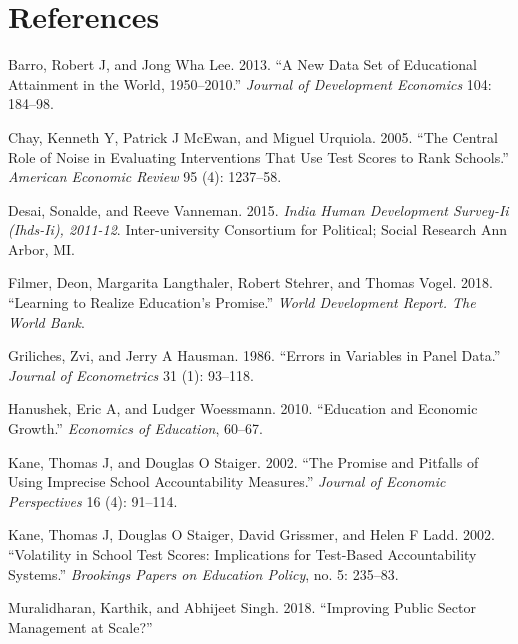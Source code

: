 \documentclass[
  11pt,
]{article}
\begin{document}
\newpage

\hypertarget{references}{%
\section{References}\label{references}}

\hypertarget{refs}{}
\leavevmode\hypertarget{ref-barro2013new}{}%
Barro, Robert J, and Jong Wha Lee. 2013. ``A New Data Set of Educational Attainment in the World, 1950--2010.'' \emph{Journal of Development Economics} 104: 184--98.

\leavevmode\hypertarget{ref-chay2005central}{}%
Chay, Kenneth Y, Patrick J McEwan, and Miguel Urquiola. 2005. ``The Central Role of Noise in Evaluating Interventions That Use Test Scores to Rank Schools.'' \emph{American Economic Review} 95 (4): 1237--58.

\leavevmode\hypertarget{ref-desai2015india}{}%
Desai, Sonalde, and Reeve Vanneman. 2015. \emph{India Human Development Survey-Ii (Ihds-Ii), 2011-12}. Inter-university Consortium for Political; Social Research Ann Arbor, MI.

\leavevmode\hypertarget{ref-filmer2018learning}{}%
Filmer, Deon, Margarita Langthaler, Robert Stehrer, and Thomas Vogel. 2018. ``Learning to Realize Education's Promise.'' \emph{World Development Report. The World Bank}.

\leavevmode\hypertarget{ref-griliches1986errors}{}%
Griliches, Zvi, and Jerry A Hausman. 1986. ``Errors in Variables in Panel Data.'' \emph{Journal of Econometrics} 31 (1): 93--118.

\leavevmode\hypertarget{ref-hanushek2010education}{}%
Hanushek, Eric A, and Ludger Woessmann. 2010. ``Education and Economic Growth.'' \emph{Economics of Education}, 60--67.

\leavevmode\hypertarget{ref-kane2002promise}{}%
Kane, Thomas J, and Douglas O Staiger. 2002. ``The Promise and Pitfalls of Using Imprecise School Accountability Measures.'' \emph{Journal of Economic Perspectives} 16 (4): 91--114.

\leavevmode\hypertarget{ref-kane2002volatility}{}%
Kane, Thomas J, Douglas O Staiger, David Grissmer, and Helen F Ladd. 2002. ``Volatility in School Test Scores: Implications for Test-Based Accountability Systems.'' \emph{Brookings Papers on Education Policy}, no. 5: 235--83.

\leavevmode\hypertarget{ref-muralidharan2018improving}{}%
Muralidharan, Karthik, and Abhijeet Singh. 2018. ``Improving Public Sector Management at Scale?''
\end{document}
